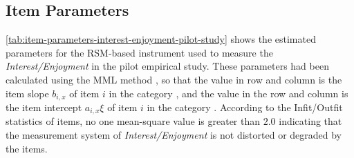 
\subsection{Item Parameters}

\autoref{tab:item-parameters-interest-enjoyment-pilot-study} shows the estimated parameters for the RSM-based instrument used to measure the \emph{Interest/Enjoyment} in the pilot empirical study. These parameters had been calculated using the MML method \cite{BockAitkin1981}, so that the value in row  and column  is the item slope $b_{i,x}$ of item $i$ in the category , and the value in the row  and column  is the item intercept $a_{i,x}\xi$ of item $i$ in the category . According to the Infit/Outfit statistics of items, no one mean-square value is greater than $2.0$ indicating that the measurement system of \emph{Interest/Enjoyment} is not distorted or degraded by the items.

